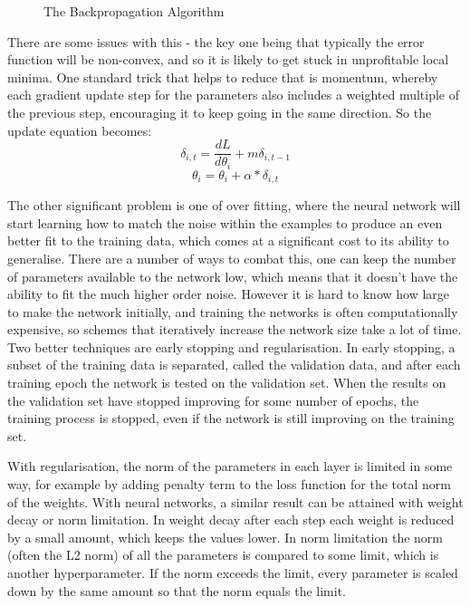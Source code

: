\begin{figure}
\centering

\caption{The Backpropagation Algorithm}
\label{fig:backprop}
\end{figure}

There are some issues with this - the key one being  that typically the error function will be non-convex, and so it is likely to get stuck in unprofitable local minima. One standard trick that helps to reduce that is momentum, whereby each gradient update step for the parameters also includes a weighted multiple of the previous step, encouraging it to keep going in the same direction. So the update equation becomes:
\begin{equation*}
\delta_{i,t} = \frac{dL}{d\theta_i} + m\delta_{i,t-1}
\end{equation*}
\begin{equation}
\theta_i = \theta_i  + \alpha * \delta_{i,t}
\end{equation}

The other significant problem is one of over fitting, where the neural network will start learning how to match the noise within the examples to produce an even better fit to the training data, which comes at a significant cost to its ability to generalise. There are a number of ways to combat this, one can keep the number of parameters available to the network low, which means that it doesn't have the ability to fit the much higher order noise. However it is hard to know how large to make the network initially, and training the networks is often computationally expensive, so schemes that iteratively increase the network size take a lot of time. Two better techniques are early stopping and regularisation. In early stopping, a subset of the training data is separated, called the validation data, and after each training epoch the network is tested on the validation set. When the results on the validation set have stopped improving for some number of epochs, the training process is stopped, even if the network is still improving on the training set.

With regularisation, the norm of the parameters in each layer is limited in some way, for example by adding penalty term to the loss function for the total norm of the weights. With neural networks, a similar result can be attained with weight decay or norm limitation. In weight decay after each step each weight is reduced by a small amount, which keeps the values lower. In norm limitation the norm (often the L2 norm) of all the parameters is compared to some limit, which is another hyperparameter. If the norm exceeds the limit, every parameter is scaled down by the same amount so that the norm equals the limit.

